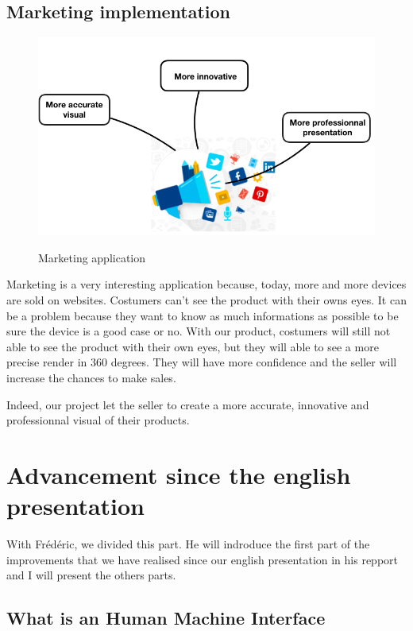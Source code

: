 \subsection{Marketing implementation}
\begin{figure}[h]
    \centering
    \includegraphics[scale=0.4]{img/marketing.png}\\%
    \caption{Marketing application}
    \label{fig:LogoTachyssema}
  \end{figure}

  Marketing is a very interesting application because, today, more and more devices are sold on websites. Costumers can't see the product with their owns eyes. It can be a problem because they want to know as much informations as possible to be sure the device is a good case or no. 
  With our product, costumers will still not able to see the product with their own eyes, but they will able to see a more precise render in 360 degrees. They will have more confidence and the seller will increase the chances to make sales.  

  Indeed, our project let the seller to create a more accurate, innovative and professionnal visual of their products. 

\section {Advancement since the english presentation  } 

With Frédéric, we divided this part. He will indroduce the first part of the improvements that we have realised since our english presentation in his repport and I will present the others parts. 

\subsection {What is an Human Machine Interface } 

